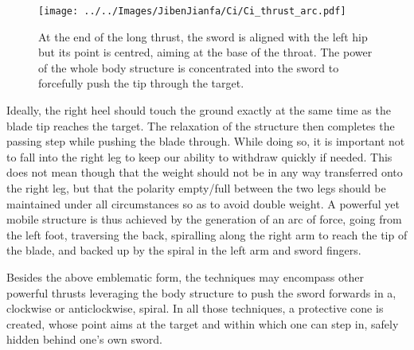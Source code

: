 \begin{figure}[ht]
\centering

	\texttt{[image: ../../Images/JibenJianfa/Ci/Ci\_thrust\_arc.pdf]}
	\caption[Long \Ci{} thrust]{At the end of the long \Ci{} thrust, the sword is aligned with the left hip but its point is centred, aiming at the base of the throat. The power of the whole body structure is concentrated into the sword to forcefully push the tip through the target.}
	\label{fig:ci_thrust}
\end{figure} 

Ideally, the right heel should touch the ground exactly at the same time as the blade tip reaches the target. The relaxation of the structure then completes the passing step while pushing the blade through. While doing so, it is important not to fall into the right leg to keep our ability to withdraw quickly if needed. This does not mean though that the weight should not be in any way transferred onto the right leg, but that the polarity empty/full between the two legs should be maintained under all circumstances so as to avoid double weight. A powerful yet mobile structure is thus achieved by the generation of an arc of force, going from the left foot, traversing the back, spiralling along the right arm to reach the tip of the blade, and backed up by the spiral in the left arm and sword fingers.

Besides the above emblematic form, the \Ci{} techniques may encompass other powerful thrusts leveraging the body structure to push the sword forwards in a, clockwise or anticlockwise, spiral. In all those techniques, a protective cone is created,  whose point aims at the target and within which one can step in, safely hidden behind one's own sword. 



